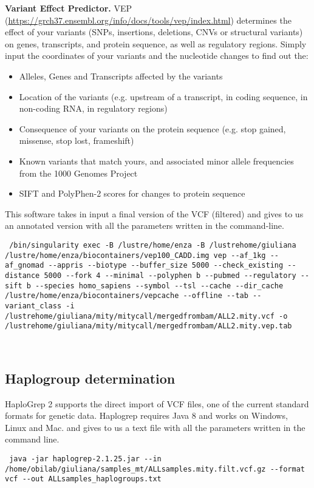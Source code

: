 \textbf{Variant Effect Predictor.}  VEP (\url{https://grch37.ensembl.org/info/docs/tools/vep/index.html}) determines the effect of your variants (SNPs, insertions, deletions, CNVs or structural variants) on genes, transcripts, and protein sequence, as well as regulatory regions.
Simply input the coordinates of your variants and the nucleotide changes to find out the:
\begin{itemize}
    \item Alleles, Genes and Transcripts affected by the variants
    \item Location of the variants (e.g. upstream of a transcript, in coding sequence, in non-coding RNA, in regulatory regions)
    \item Consequence of your variants on the protein sequence (e.g. stop gained, missense, stop lost, frameshift)
    \item Known variants that match yours, and associated minor allele frequencies from the 1000 Genomes Project
    \item  SIFT and PolyPhen-2 scores for changes to protein sequence
\end{itemize}
\newline
This software takes in input a final version of the VCF (filtered) and gives to us an annotated version with all the parameters written in the command-line. \newline

\begin{verbatim} /bin/singularity exec -B /lustre/home/enza -B /lustrehome/giuliana /lustre/home/enza/biocontainers/vep100_CADD.img vep --af_1kg --af_gnomad --appris --biotype --buffer_size 5000 --check_existing --distance 5000 --fork 4 --minimal --polyphen b --pubmed --regulatory --sift b --species homo_sapiens --symbol --tsl --cache --dir_cache /lustre/home/enza/biocontainers/vepcache --offline --tab --variant_class -i /lustrehome/giuliana/mity/mitycall/mergedfrombam/ALL2.mity.vcf -o /lustrehome/giuliana/mity/mitycall/mergedfrombam/ALL2.mity.vep.tab
\end{verbatim}\\


\subsection{Haplogroup determination}
HaploGrep 2 supports the direct import of VCF files, one of the current standard formats for genetic data.
Haplogrep requires Java 8 and works on Windows, Linux and Mac. and gives to us a text file with all the parameters written in the command line. \newline

\begin{verbatim} java -jar haplogrep-2.1.25.jar --in /home/obilab/giuliana/samples_mt/ALLsamples.mity.filt.vcf.gz --format vcf --out ALLsamples_haplogroups.txt \end{verbatim}\\
\textbf{}

